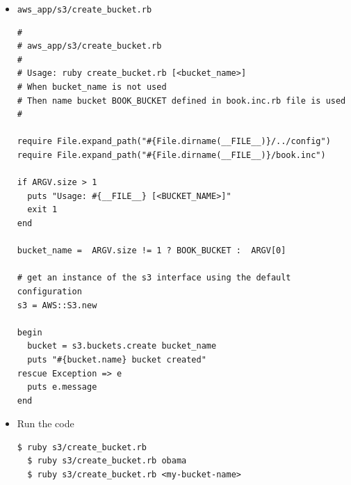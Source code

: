 \documentclass{beamer}
\begin{document}
\begin{frame}
\begin{itemize}
\begin{lstlisting}[escapechar=$]
access_key_id: YOUR_ACCESS_KEY_ID
secret_access_key: YOUR_SECRET_ACCESS_KEY
#
# aws_app/s3/create_bucket.rbA bit of Dont Repeat Yourself
#
# Usage: ruby create_bucket.rb [<bucket_name>]

require File.expand_path("#{File.dirname(__FILE__)}/../config")
require File.expand_path("#{File.dirname(__FILE__)}/book.inc")

if ARGV.size > 1
  puts "Usage: #{__FILE__} [<BUCKET_NAME>]"
  exit 1
end

bucket_name =  ARGV.size != 1 ? BOOK_BUCKET :  ARGV[0]

# get an instance of the s3 interface using the default configuration
s3 = AWS::S3.new

begin
  bucket = s3.buckets.create bucket_nameA bit of Dont Repeat Yourself
  puts "#{bucket.name} bucket created"
rescue Exception => e
  puts e.message
end
END
  exit 1
end

config = YAML.load(File.read(config_file))

unless config.kind_of?(Hash)
  puts <<END
config.yml is formatted incorrectly.  Please use the following format:

access_key_id: YOUR_ACCESS_KEY_ID
secret_access_key: YOUR_SECRET_ACCESS_KEY

END
  exit 1
end

AWS.config(config)

\end{lstlisting}

\item \texttt{aws\_app/s3/create\_bucket.rb}
\lstset{language=Ruby, style=eclipse}
\begin{lstlisting}[escapechar=$]
#
# aws_app/s3/create_bucket.rb
#
# Usage: ruby create_bucket.rb [<bucket_name>]
# When bucket_name is not used
# Then name bucket BOOK_BUCKET defined in book.inc.rb file is used
#

require File.expand_path("#{File.dirname(__FILE__)}/../config")
require File.expand_path("#{File.dirname(__FILE__)}/book.inc")

if ARGV.size > 1
  puts "Usage: #{__FILE__} [<BUCKET_NAME>]"
  exit 1
end

bucket_name =  ARGV.size != 1 ? BOOK_BUCKET :  ARGV[0]

# get an instance of the s3 interface using the default configuration
s3 = AWS::S3.new

begin
  bucket = s3.buckets.create bucket_name
  puts "#{bucket.name} bucket created"
rescue Exception => e
  puts e.message
end
\end{lstlisting}

\item Run the code
\lstset{language=shell}
\begin{lstlisting}[escapechar=!]
  $ ruby s3/create_bucket.rb
  $ ruby s3/create_bucket.rb obama
  $ ruby s3/create_bucket.rb <my-bucket-name>
\end{lstlisting}

\end{itemize}
\end{frame}
\end{document}
